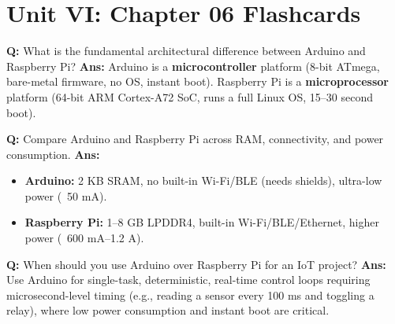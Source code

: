 \documentclass[10pt,a4paper,twocolumn]{article}
\begin{document}
\section*{Unit VI: Chapter 06 Flashcards}

\begin{tcolorbox}[
  colback=white,
  colframe=UnitColorSix,
  colbacktitle=gray!10!white,
  coltitle=black,
  fonttitle=\bfseries\sffamily\small,
  title={Unit VI $\bullet$ Card 1},
  boxrule=1.2pt,
  arc=2mm,
  outer arc=2mm,
  boxsep=1.5mm,
  top=1mm,
  bottom=1mm,
  left=1.5mm,
  right=1.5mm,
  before skip=2.5mm,
  after skip=2.5mm
]
\textbf{Q:} What is the fundamental architectural difference between Arduino and Raspberry Pi?
\tcbline
\textbf{Ans:} Arduino is a \textbf{microcontroller} platform (8-bit ATmega, bare-metal firmware, no OS, instant boot). Raspberry Pi is a \textbf{microprocessor} platform (64-bit ARM Cortex-A72 SoC, runs a full Linux OS, 15–30 second boot).
\end{tcolorbox}


\begin{tcolorbox}[
  colback=white,
  colframe=UnitColorSix,
  colbacktitle=gray!10!white,
  coltitle=black,
  fonttitle=\bfseries\sffamily\small,
  title={Unit VI $\bullet$ Card 2},
  boxrule=1.2pt,
  arc=2mm,
  outer arc=2mm,
  boxsep=1.5mm,
  top=1mm,
  bottom=1mm,
  left=1.5mm,
  right=1.5mm,
  before skip=2.5mm,
  after skip=2.5mm
]
\textbf{Q:} Compare Arduino and Raspberry Pi across RAM, connectivity, and power consumption.
\tcbline
\textbf{Ans:} \begin{itemize}
  \item \textbf{Arduino:} 2 KB SRAM, no built-in Wi-Fi/BLE (needs shields), ultra-low power (~50 mA).
  \item \textbf{Raspberry Pi:} 1–8 GB LPDDR4, built-in Wi-Fi/BLE/Ethernet, higher power (~600 mA–1.2 A).
\end{itemize}
\end{tcolorbox}


\begin{tcolorbox}[
  colback=white,
  colframe=UnitColorSix,
  colbacktitle=gray!10!white,
  coltitle=black,
  fonttitle=\bfseries\sffamily\small,
  title={Unit VI $\bullet$ Card 3},
  boxrule=1.2pt,
  arc=2mm,
  outer arc=2mm,
  boxsep=1.5mm,
  top=1mm,
  bottom=1mm,
  left=1.5mm,
  right=1.5mm,
  before skip=2.5mm,
  after skip=2.5mm
]
\textbf{Q:} When should you use Arduino over Raspberry Pi for an IoT project?
\tcbline
\textbf{Ans:} Use Arduino for single-task, deterministic, real-time control loops requiring microsecond-level timing (e.g., reading a sensor every 100 ms and toggling a relay), where low power consumption and instant boot are critical.
\end{tcolorbox}
\end{document}
